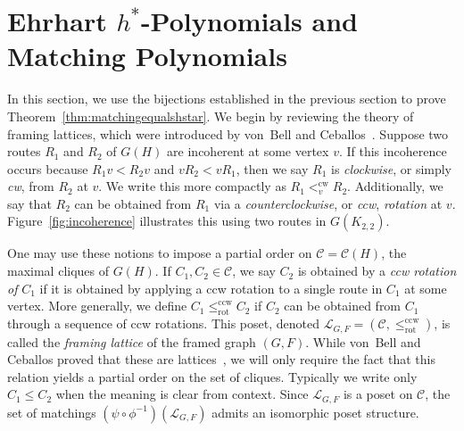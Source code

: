 \documentclass[12pt]{amsart}
\theoremstyle{definition}
\newcommand{\scrL}{\mathscr{L}}
\newcommand{\cliques}{\mathcal{C}}
\DeclareMathOperator{\ccw}{ccw}
\DeclareMathOperator{\cw}{cw}
\DeclareMathOperator{\rot}{rot}
\begin{document}
\section{Ehrhart $h^*$-Polynomials and Matching Polynomials}\label{sec:ehrhartbijection}

In this section, we use the bijections established in the previous section to prove Theorem~\ref{thm:matchingequalshstar}.
We begin by reviewing the theory of framing lattices, which were introduced by von~Bell and Ceballos~\cite{framinglattices}.
Suppose two routes $R_1$ and $R_2$ of $G(H)$ are incoherent at some vertex $v$.
If this incoherence occurs because $R_1v < R_2v$ and $vR_2 < vR_1$, then we say $R_1$ is \emph{clockwise}, or simply \emph{cw}, from $R_2$ at $v$.
We write this more compactly as $R_1 <_v^{\cw} R_2$.
Additionally, we say that $R_2$ can be obtained from $R_1$ via a \emph{counterclockwise}, or \emph{ccw}, \emph{rotation} at $v$.
Figure~\ref{fig:incoherence} illustrates this using two routes in $G(K_{2,2})$.

One may use these notions to impose a partial order on $\cliques=\cliques(H)$, the maximal cliques of $G(H)$. 
If $C_1, C_2 \in \cliques$, we say $C_2$ is obtained by a \emph{ccw rotation of} $C_1$ if it is obtained by applying a ccw rotation to a single route in $C_1$ at some vertex.
More generally, we define $C_1 \leq_{\rot}^{\ccw} C_2$ if $C_2$ can be obtained from $C_1$ through a sequence of ccw rotations.
This poset, denoted $\scrL_{G,F} = (\cliques, \leq_{\rot}^{\ccw})$, is called the \emph{framing lattice} of the framed graph $(G,F)$.
While von~Bell and Ceballos proved that these are lattices~\cite{framinglattices}, we will only require the fact that this relation yields a partial order on the set of cliques.
Typically we write only $C_1 \leq C_2$ when the meaning is clear from context. 
Since $\scrL_{G,F}$ is a poset on $\cliques$, the set of matchings $(\psi \circ \phi^{-1})(\scrL_{G,F})$ admits an isomorphic poset structure.
\end{document}
